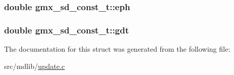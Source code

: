 \hypertarget{structgmx__sd__const__t_a97ba66f46e4cdcd99ccd400bb2b7bc4e}{
\subsubsection[{eph}]{\setlength{\rightskip}{0pt plus 5cm}double {\bf gmx\-\_\-sd\-\_\-const\-\_\-t\-::eph}}}\label{structgmx__sd__const__t_a97ba66f46e4cdcd99ccd400bb2b7bc4e}
\hypertarget{structgmx__sd__const__t_a96ac302f96392f0a61555cb38fad03c2}{
\subsubsection[{gdt}]{\setlength{\rightskip}{0pt plus 5cm}double {\bf gmx\-\_\-sd\-\_\-const\-\_\-t\-::gdt}}}\label{structgmx__sd__const__t_a96ac302f96392f0a61555cb38fad03c2}


\-The documentation for this struct was generated from the following file\-:\begin{DoxyCompactItemize}
\item 
src/mdlib/\hyperlink{update_8c}{update.\-c}\end{DoxyCompactItemize}
